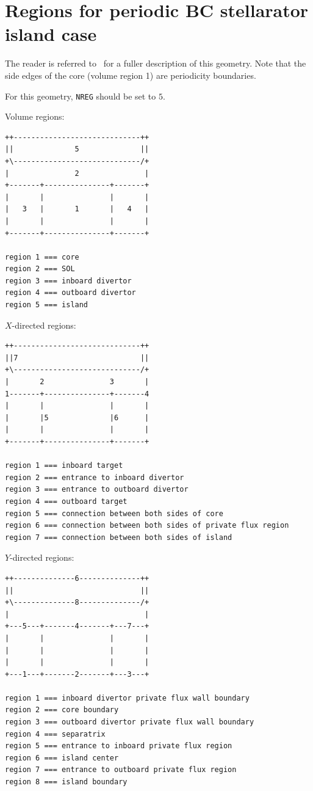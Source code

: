 \documentclass[a4paper,10pt]{report}
\begin{document}
\clearpage
\section{Regions for periodic BC stellarator island case}

The reader is referred to~\cite{BONNINPSI14} for a fuller description of this
geometry.
Note that the side edges of the core (volume region 1) are periodicity
boundaries.

For this geometry, {\tt NREG} should be set to $5$.

Volume regions:
\begin{verbatim}
++-----------------------------++
||              5              ||
+\-----------------------------/+
|               2               |
+-------+---------------+-------+
|       |               |       |
|   3   |       1       |   4   |
|       |               |       |
+-------+---------------+-------+

region 1 === core
region 2 === SOL
region 3 === inboard divertor
region 4 === outboard divertor
region 5 === island
\end{verbatim}

$X$-directed regions:
\begin{verbatim}
++-----------------------------++
||7                            ||
+\-----------------------------/+
|       2               3       |
1-------+---------------+-------4
|       |               |       |
|       |5              |6      |
|       |               |       |
+-------+---------------+-------+

region 1 === inboard target
region 2 === entrance to inboard divertor
region 3 === entrance to outboard divertor
region 4 === outboard target
region 5 === connection between both sides of core
region 6 === connection between both sides of private flux region
region 7 === connection between both sides of island
\end{verbatim}

\clearpage
$Y$-directed regions:
\begin{verbatim}
++--------------6--------------++
||                             ||
+\--------------8--------------/+
|                               |
+---5---+-------4-------+---7---+
|       |               |       |
|       |               |       |
|       |               |       |
+---1---+-------2-------+---3---+

region 1 === inboard divertor private flux wall boundary
region 2 === core boundary
region 3 === outboard divertor private flux wall boundary
region 4 === separatrix
region 5 === entrance to inboard private flux region
region 6 === island center
region 7 === entrance to outboard private flux region
region 8 === island boundary
\end{verbatim}
\end{document}
